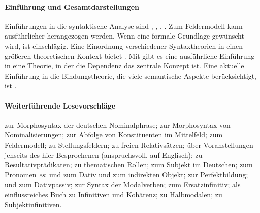 \WeitereLiteratur

\begin{sloppypar}

\paragraph*{Einführung und Gesamtdarstellungen}

Einführungen in die syntaktische Analyse sind \zB \citet{Duerscheid2012}, \citet{WoellsteinEa1997}, \citet{Eroms2000}, \citet{Musan2009}.
Zum Feldermodell kann ausführlicher \citet{Woellstein2010} herangezogen werden.
Wenn eine formale Grundlage gewünscht wird, ist \citet{Mueller08} einschlägig.
Eine Einordnung verschiedener Syntaxtheorien in einen größeren theoretischen Kontext bietet \citet{Mueller10}.
Mit \citet{Engel09} gibt es eine ausführliche Einführung in eine Theorie, in der die Dependenz das zentrale Konzept ist.
Eine aktuelle Einführung in die Bindungstheorie, die viele semantische Aspekte berücksichtigt, ist \citet{Buering2005}.

\paragraph*{Weiterführende Lesevorschläge}
\citet{Gallmann1996} zur Morphosyntax der deutschen Nominalphrase;
\citet{Fabricius1993} zur Morphosyntax von Nominalisierungen;
\citet{Loetscher1981} zur Abfolge von Konstituenten im Mittelfeld;
\citet{Hoehle1986} zum Feldermodell;
\citet{Askedal1986} zu Stellungsfeldern;
\citet{Pittner2003} zu freien Relativsätzen;
\citet{DekuthyMeurers2001} über Voranstellungen jenseits des hier Besprochenen (anspruchsvoll, auf Englisch);
\citet{Richter2002} zu Resultativprädikaten;
\citet{Dowty91} zu thematischen Rollen;
\citet{Reis1982} zum Subjekt im Deutschen;
\citet{Askedal1990} zum Pronomen \textit{es};
\citet{Wegener1986} und \citet{Wegener1991} zum Dativ und zum indirekten Objekt;
\citet{Musan1999} zur Perfektbildung;
\citet{HentschelWeydt1995} und \citet{Leirbukt2013} zum Dativpassiv;
\citet{Reis2001} zur Syntax der Modalverben;
\citet{Askedal1991} zum Ersatzinfinitiv;
\citet{Bech1983} als einflussreiches Buch zu Infinitiven und Kohärenz;
\citet{Reis2005} zu Halbmodalen;
\citet{Askedal1988} zu Subjektinfinitiven.

\end{sloppypar}

